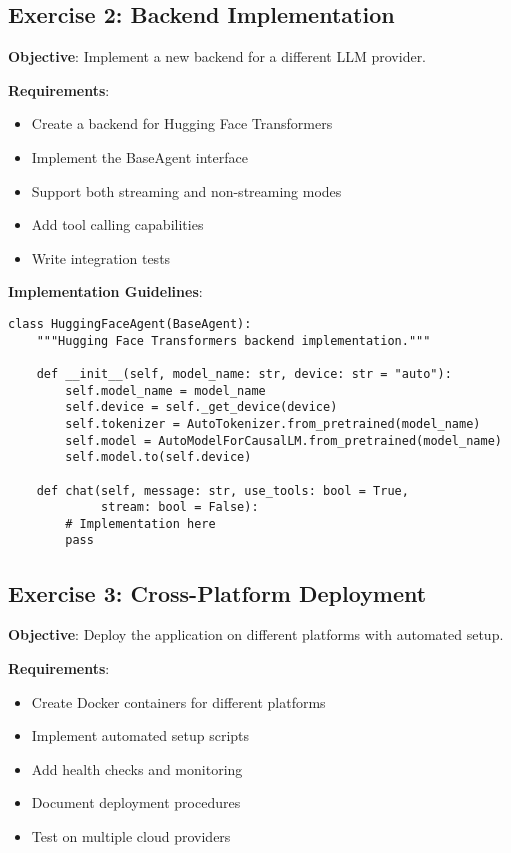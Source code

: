 \documentclass{article}
\begin{document}
\subsection{Exercise 2: Backend Implementation}

\textbf{Objective}: Implement a new backend for a different LLM provider.

\textbf{Requirements}:
\begin{itemize}
    \item Create a backend for Hugging Face Transformers
    \item Implement the BaseAgent interface
    \item Support both streaming and non-streaming modes
    \item Add tool calling capabilities
    \item Write integration tests
\end{itemize}

\textbf{Implementation Guidelines}:
\begin{lstlisting}[caption=New Backend Template]
class HuggingFaceAgent(BaseAgent):
    """Hugging Face Transformers backend implementation."""

    def __init__(self, model_name: str, device: str = "auto"):
        self.model_name = model_name
        self.device = self._get_device(device)
        self.tokenizer = AutoTokenizer.from_pretrained(model_name)
        self.model = AutoModelForCausalLM.from_pretrained(model_name)
        self.model.to(self.device)

    def chat(self, message: str, use_tools: bool = True,
             stream: bool = False):
        # Implementation here
        pass
\end{lstlisting}

\subsection{Exercise 3: Cross-Platform Deployment}

\textbf{Objective}: Deploy the application on different platforms with automated setup.

\textbf{Requirements}:
\begin{itemize}
    \item Create Docker containers for different platforms
    \item Implement automated setup scripts
    \item Add health checks and monitoring
    \item Document deployment procedures
    \item Test on multiple cloud providers
\end{itemize}
\end{document}
